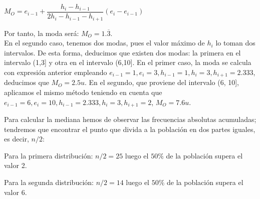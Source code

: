 \begin{center}
	$M_O = e_{i-1} + \dfrac{h_i - h_{i-1}}{2h_i - h_{i-1} - h_{i+1}} (e_i - e_{i-1})$
\end{center}

Por tanto, la moda será: $M_O = 1.\overline{3}$.\\


En el segundo caso, tenemos dos modas, pues el valor máximo de $h_{i}$ lo toman dos intervalos. De esta forma, deducimos que existen dos modas: la primera en el intervalo (1,3] y otra en el intervalo (6,10]. En el primer caso, la moda se calcula con expresión anterior empleando $e_{i-1} = 1, e_i=3, h_{i-1} = 1, h_i = 3, h_{i+1} = 2.333 $, deducimos que $M_O = 2.5 u$. En el segundo, que proviene del intervalo (6, 10], aplicamos el mismo método teniendo en cuenta que $e_{i-1} = 6, e_i=10, h_{i-1} = 2.333, h_i = 3, h_{i+1} = 2 $, $M_O = 7.6 u$.

\subproblem

Para calcular la mediana hemos de observar las frecuencias absolutas acumuladas; tendremos que encontrar el punto que divida a la población en dos partes iguales, es decir, $n/2$:

Para la primera distribución: $n/2 = 25$ luego el $50\%$ de la población supera el valor 2.

Para la segunda distribución: $n/2 = 14$ luego el $50\%$ de la población supera el valor 6.\\
\\

\subproblem

